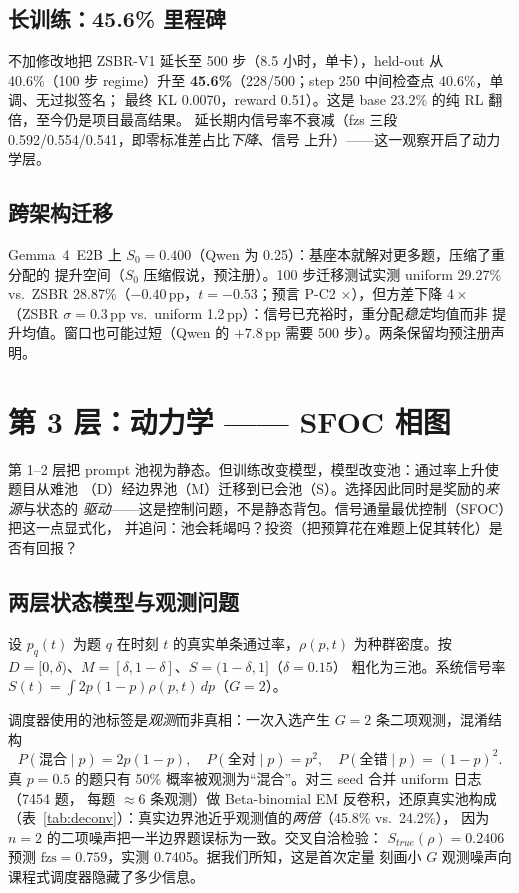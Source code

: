 \documentclass[11pt]{article}
\theoremstyle{definition}
\newcommand{\fzs}{\text{fzs}}
\begin{document}
\subsection{长训练：45.6\% 里程碑}\label{sec:l2-long}
不加修改地把 ZSBR-V1 延长至 500 步（8.5 小时，单卡），held-out 从 40.6\%（100 步
regime）升至 \textbf{45.6\%}（228/500；step 250 中间检查点 40.6\%，单调、无过拟签名；
最终 KL 0.0070，reward 0.51）。这是 base 23.2\% 的纯 RL 翻倍，至今仍是项目最高结果。
延长期内信号率不衰减（fzs 三段 0.592/0.554/0.541，即零标准差占比\emph{下降}、信号
上升）——这一观察开启了动力学层。

\subsection{跨架构迁移}\label{sec:l2-transfer}
Gemma~4~E2B 上 $S_0{=}0.400$（Qwen 为 0.25）：基座本就解对更多题，压缩了重分配的
提升空间（$S_0$ 压缩假说，预注册）。100 步迁移测试实测 uniform 29.27\% vs.\ ZSBR
28.87\%（$-0.40$\,pp，$t{=}-0.53$；预言 P-C2 $\times$），但方差下降 $4\times$（ZSBR
$\sigma{=}0.3$\,pp vs.\ uniform 1.2\,pp）：信号已充裕时，重分配\emph{稳定}均值而非
提升均值。窗口也可能过短（Qwen 的 $+7.8$\,pp 需要 500 步）。两条保留均预注册声明。


\section{第 3 层：动力学 —— SFOC 相图}\label{sec:l3}
第 1--2 层把 prompt 池视为静态。但训练改变模型，模型改变池：通过率上升使题目从难池
（D）经边界池（M）迁移到已会池（S）。选择因此同时是奖励的\emph{来源}与状态的
\emph{驱动}——这是控制问题，不是静态背包。信号通量最优控制（SFOC）把这一点显式化，
并追问：池会耗竭吗？投资（把预算花在难题上促其转化）是否有回报？

\subsection{两层状态模型与观测问题}\label{sec:l3-deconv}
设 $p_q(t)$ 为题 $q$ 在时刻 $t$ 的真实单条通过率，$\rho(p,t)$ 为种群密度。按
$D{=}[0,\delta)$、$M{=}[\delta,1{-}\delta]$、$S{=}(1{-}\delta,1]$（$\delta{=}0.15$）
粗化为三池。系统信号率 $S(t)=\int 2p(1-p)\rho(p,t)\,dp$（$G{=}2$）。

调度器使用的池标签是\emph{观测}而非真相：一次入选产生 $G{=}2$ 条二项观测，混淆结构
\begin{equation}\label{eq:confusion}
P(\text{混合}\mid p)=2p(1-p),\quad
P(\text{全对}\mid p)=p^2,\quad
P(\text{全错}\mid p)=(1-p)^2 .
\end{equation}
真 $p{=}0.5$ 的题只有 50\% 概率被观测为“混合”。对三 seed 合并 uniform 日志（7454 题，
每题 ${\approx}6$ 条观测）做 Beta-binomial EM 反卷积，还原真实池构成
（表~\ref{tab:deconv}）：真实边界池近乎观测值的\emph{两倍}（45.8\% vs.\ 24.2\%），
因为 $n{=}2$ 的二项噪声把一半边界题误标为一致。交叉自洽检验：
$S_{true}(\rho){=}0.2406$ 预测 $\fzs{=}0.759$，实测 0.7405。据我们所知，这是首次定量
刻画小 $G$ 观测噪声向课程式调度器隐藏了多少信息。
\end{document}
